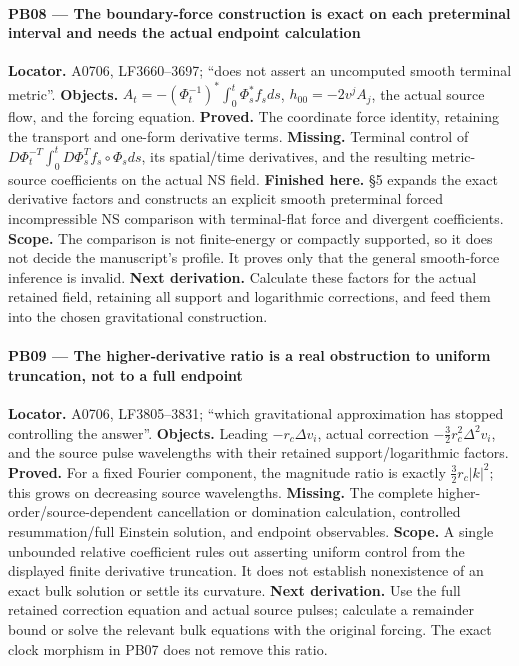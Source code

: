 \documentclass[10pt,a4paper,oneside]{report}
\begin{document}
\paragraph{PB08 --- The boundary-force construction is exact on each
preterminal interval and needs the actual endpoint
calculation}\label{pb08-the-boundary-force-construction-is-exact-on-each-preterminal-interval-and-needs-the-actual-endpoint-calculation}

\textbf{Locator.} A0706, LF3660--3697; ``does not assert an uncomputed
smooth terminal metric''. \textbf{Objects.}
\(A_t=-(\Phi_t^{-1})^*\int_0^t\Phi_s^*f_sds\), \(h_{00}=-2v^jA_j\), the
actual source flow, and the forcing equation. \textbf{Proved.} The
coordinate force identity, retaining the transport and one-form
derivative terms. \textbf{Missing.} Terminal control of
\(D\Phi_t^{-T}\int_0^tD\Phi_s^Tf_s\circ\Phi_sds\), its spatial/time
derivatives, and the resulting metric-source coefficients on the actual
NS field. \textbf{Finished here.} \protect{} §5
expands the exact derivative factors and constructs an explicit smooth
preterminal forced incompressible NS comparison with terminal-flat force
and divergent coefficients. \textbf{Scope.} The comparison is not
finite-energy or compactly supported, so it does not decide the
manuscript's profile. It proves only that the general smooth-force
inference is invalid. \textbf{Next derivation.} Calculate these factors
for the actual retained field, retaining all support and logarithmic
corrections, and feed them into the chosen gravitational construction.

\paragraph{PB09 --- The higher-derivative ratio is a real obstruction to
uniform truncation, not to a full
endpoint}\label{pb09-the-higher-derivative-ratio-is-a-real-obstruction-to-uniform-truncation-not-to-a-full-endpoint}

\textbf{Locator.} A0706, LF3805--3831; ``which gravitational
approximation has stopped controlling the answer''. \textbf{Objects.}
Leading \(-r_c\Delta v_i\), actual correction
\(-\tfrac32r_c^2\Delta^2v_i\), and the source pulse wavelengths with
their retained support/logarithmic factors. \textbf{Proved.} For a fixed
Fourier component, the magnitude ratio is exactly \(\tfrac32r_c|k|^2\);
this grows on decreasing source wavelengths. \textbf{Missing.} The
complete higher-order/source-dependent cancellation or domination
calculation, controlled resummation/full Einstein solution, and endpoint
observables. \textbf{Scope.} A single unbounded relative coefficient
rules out asserting uniform control from the displayed finite derivative
truncation. It does not establish nonexistence of an exact bulk solution
or settle its curvature. \textbf{Next derivation.} Use the full retained
correction equation and actual source pulses; calculate a remainder
bound or solve the relevant bulk equations with the original forcing.
The exact clock morphism in PB07 does not remove this ratio.
\end{document}
